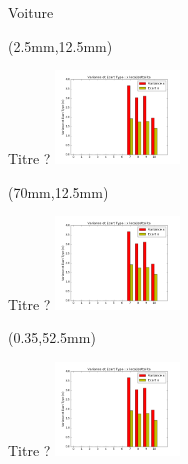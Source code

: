 \documentclass[10pt]{beamer}
\begin{document}
	\begin{frame}{Voiture}
		\begin{textblock*}{60mm}(2.5mm,12.5mm)
			\begin{block}{Titre ?}
				\includegraphics[width=125px]{../src/data/itinary_3/var_ecart_sat_x.png}
			\end{block}
		\end{textblock*}

		\begin{textblock*}{60mm}(70mm,12.5mm)
			\begin{block}{Titre ?}
				\includegraphics[width=125px]{../src/data/itinary_3/var_ecart_sat_x.png}
			\end{block}
		\end{textblock*}

		\begin{textblock*}{60mm}(0.35\textwidth,52.5mm)
			\begin{block}{Titre ?}
				\includegraphics[width=125px]{../src/data/itinary_3/var_ecart_sat_x.png}
			\end{block}
		\end{textblock*}
	\end{frame}
\end{document}
